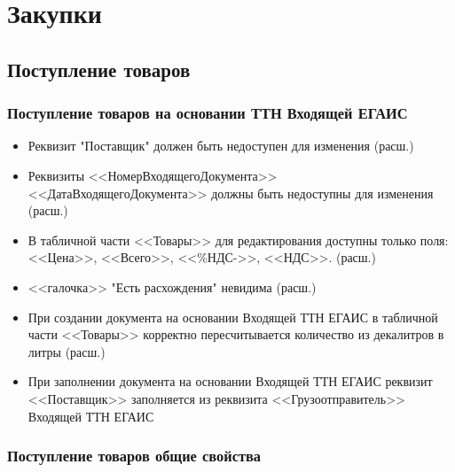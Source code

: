 \section{Закупки}
\subsection{Поступление товаров}
\subsubsection{Поступление товаров на основании ТТН Входящей ЕГАИС}



\begin{itemize}
	\item Реквизит "Поставщик" должен быть недоступен для изменения (расш.)
	\item Реквизиты <<НомерВходящегоДокумента>> <<ДатаВходящегоДокумента>> должны быть недоступны для изменения (расш.)
	\item В табличной части <<Товары>> для редактирования доступны только поля:
	<<Цена>>, <<Всего>>, <<\%НДС->>, <<НДС>>.  (расш.)
	\item <<галочка>> "Есть расхождения" невидима (расш.)
	\item При создании документа на основании Входящей ТТН ЕГАИС в табличной части <<Товары>>
	корректно пересчитывается количество из  декалитров в литры (расш.)
	\item При заполнении документа на основании Входящей ТТН ЕГАИС реквизит <<Поставщик>> заполняется из реквизита <<Грузоотправитель>> Входящей ТТН ЕГАИС

\end{itemize}

\subsubsection{Поступление товаров общие свойства}

